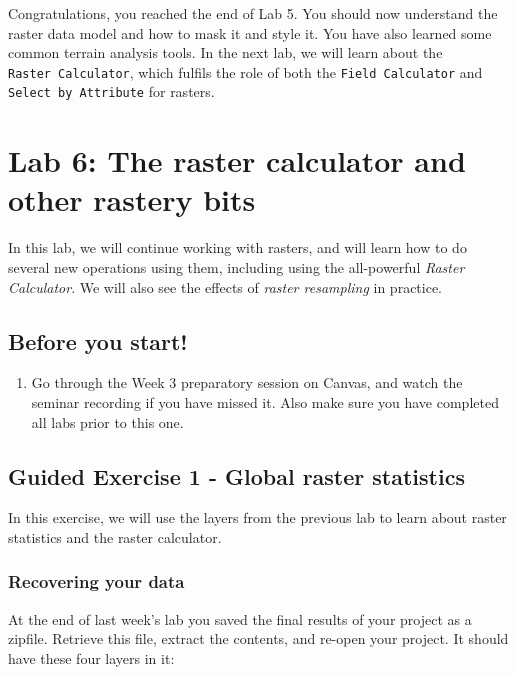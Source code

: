\documentclass[
  letterpaper,
  DIV=11,
  numbers=noendperiod]{scrreprt}
\providecommand{\tightlist}{%
  \setlength{\itemsep}{0pt}\setlength{\parskip}{0pt}}\usepackage{longtable,booktabs,array}
\begin{document}
Congratulations, you reached the end of Lab 5. You should now understand
the raster data model and how to mask it and style it. You have also
learned some common terrain analysis tools. In the next lab, we will
learn about the \texttt{Raster\ Calculator}, which fulfils the role of
both the \texttt{Field\ Calculator} and \texttt{Select\ by\ Attribute}
for rasters.

\chapter{Lab 6: The raster calculator and other rastery
bits}\label{sec-labras2}

In this lab, we will continue working with rasters, and will learn how
to do several new operations using them, including using the
all-powerful \emph{Raster Calculator}. We will also see the effects of
\emph{raster resampling} in practice.

\section{Before you start!}\label{before-you-start-4}

\begin{enumerate}
\def\labelenumi{\arabic{enumi}.}
\tightlist
\item
  Go through the Week 3 preparatory session on Canvas, and watch the
  seminar recording if you have missed it. Also make sure you have
  completed all labs prior to this one.
\end{enumerate}

\section{Guided Exercise 1 - Global raster
statistics}\label{guided-exercise-1---global-raster-statistics}

In this exercise, we will use the layers from the previous lab to learn
about raster statistics and the raster calculator.

\subsection{Recovering your data}\label{recovering-your-data}

At the end of last week's lab you saved the final results of your
project as a zipfile. Retrieve this file, extract the contents, and
re-open your project. It should have these four layers in it:
\end{document}
